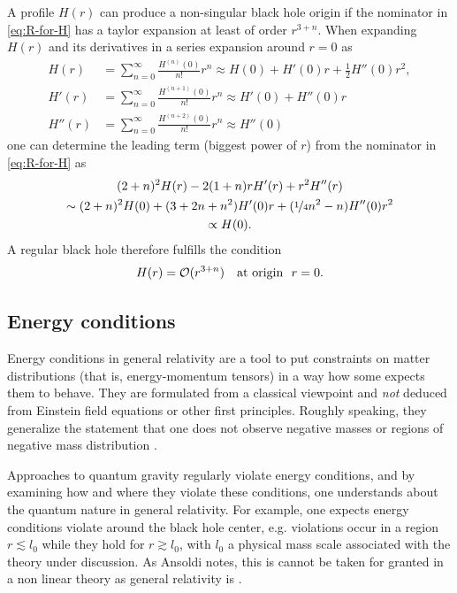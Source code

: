 \documentclass[12pt,a4paper]{report}
\numberwithin{equation}{chapter}
\begin{document}
A profile $H(r)$ can produce a non-singular black hole origin if the nominator in \eqref{eq:R-for-H} has a taylor expansion at least of order $r^{3+n}$. When expanding $H(r)$ and its derivatives in a series expansion around $r=0$ as
\begin{align}
H(r) &= \sum_{n=0}^\infty \frac{H^{(n)}(0)}{n!} r^n
\approx H(0) + H'(0) r + \frac 12 H''(0) r^2,
\\
H'(r) &= \sum_{n=0}^\infty \frac{H^{(n+1)}(0)}{n!} r^n
\approx H'(0) + H''(0) r %
\\
H''(r) &= \sum_{n=0}^\infty \frac{H^{(n+2)}(0)}{n!} r^n
\approx H''(0) %
\end{align}
one can determine the leading term (biggest power of $r$) from the nominator in \eqref{eq:R-for-H} as
\begin{multline}
(2+n)^2 H(r) - 2(1+n) r H'(r) + r^2 H''(r)
\\
\sim (2+n)^2 H(0) + (3+2n+n^2) H'(0) r  + (\nicefrac 14 n^2 - n) H''(0) r^2
\\
\propto H(0).
\end{multline}
A regular black hole therefore fulfills the condition
\begin{equation}
H(r) = {\cal O}( r^{3+n} )
\quad\text{at origin }~r=0.
\end{equation}

\subsection{Energy conditions}
Energy conditions in general relativity are a tool to put constraints on matter distributions (that is, energy-momentum tensors) in a way how some expects them to behave. They are formulated from a classical viewpoint and \emph{not} deduced from Einstein field equations or other first principles. Roughly speaking, they generalize the statement that one does not observe negative masses or regions of negative mass distribution \cite{Poisson}.

Approaches to quantum gravity regularly violate energy conditions, and by examining how and where they violate these conditions, one understands about the quantum nature in general relativity. For example, one expects energy conditions violate around the black hole center, e.g. violations occur in a region $r \lesssim l_0$ while they hold for $r \gtrsim l_0$, with $l_0$ a physical mass scale associated with the theory under discussion. As Ansoldi notes, this is cannot be taken for granted in a non linear theory as general relativity is \cite{Ansoldi2008}.
\end{document}
